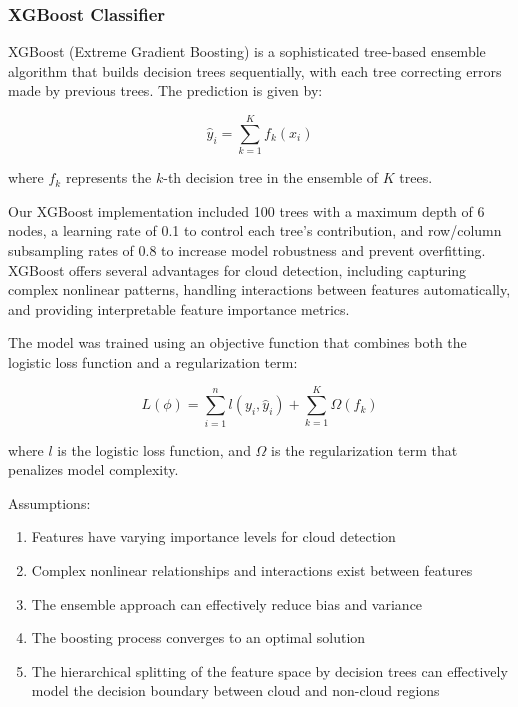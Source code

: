 \documentclass[10pt,letterpaper]{article}
\begin{document}
\subsubsection{XGBoost Classifier}

XGBoost (Extreme Gradient Boosting) is a sophisticated tree-based ensemble algorithm that builds decision trees sequentially, with each tree correcting errors made by previous trees. The prediction is given by:

\begin{equation}
\hat{y}_i = \sum_{k=1}^{K} f_k(x_i)
\end{equation}

where $f_k$ represents the $k$-th decision tree in the ensemble of $K$ trees. 

Our XGBoost implementation included 100 trees with a maximum depth of 6 nodes, a learning rate of 0.1 to control each tree's contribution, and row/column subsampling rates of 0.8 to increase model robustness and prevent overfitting. XGBoost offers several advantages for cloud detection, including capturing complex nonlinear patterns, handling interactions between features automatically, and providing interpretable feature importance metrics.

The model was trained using an objective function that combines both the logistic loss function and a regularization term:

\begin{equation}
L(\phi) = \sum_{i=1}^{n} l(y_i, \hat{y}_i) + \sum_{k=1}^{K} \Omega(f_k)
\end{equation}

where $l$ is the logistic loss function, and $\Omega$ is the regularization term that penalizes model complexity.

Assumptions:
\begin{enumerate}
    \item Features have varying importance levels for cloud detection
    \item Complex nonlinear relationships and interactions exist between features
    \item The ensemble approach can effectively reduce bias and variance
    \item The boosting process converges to an optimal solution
    \item The hierarchical splitting of the feature space by decision trees can effectively model the decision boundary between cloud and non-cloud regions
\end{enumerate}
\end{document}

